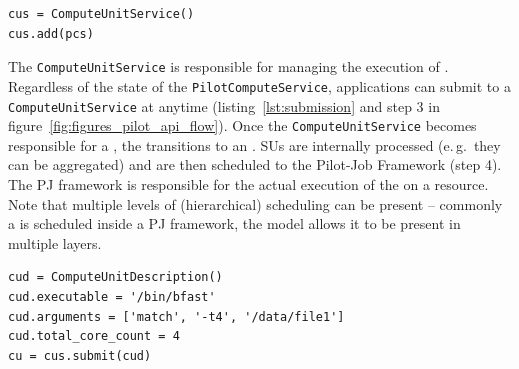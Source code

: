 \documentclass[conference]{IEEEtran}
\begin{document}
\begin{minipage}{0.45 \textwidth}
\begin{lstlisting}[caption={\I{Instantiation
of a \texttt{ComputeUnitService} using a reference to the
\texttt{PilotComputeService}.}}, label={lst:cus_creation}]
cus = ComputeUnitService()
cus.add(pcs)
\end{lstlisting}
\end{minipage}


The \texttt{Compute\-Unit\-Service} is responsible for managing the execution of
\cus.
Regardless of the state of the \texttt{Pilot\-Compute\-Service}, applications can submit \cus to a
\texttt{Compute\-Unit\-Service} at anytime (listing~\ref{lst:submission} and step 3
in figure~\ref{fig:figures_pilot_api_flow}). 
Once the \texttt{Compute\-Unit\-Service} becomes responsible for a \cu, the \cu
transitions to an \su.
SUs are internally processed (e.\,g.\ they can be aggregated) and are then scheduled to the Pilot-Job Framework (step 4). 
The PJ framework is responsible for the actual execution of the \su on a
resource.
Note that multiple levels of (hierarchical) scheduling can be present -- commonly
a \su is scheduled inside a PJ framework, the model allows it to be present
in multiple layers.\\

\begin{minipage}{0.45 \textwidth}
\begin{lstlisting}[caption={\I{Instantiation and 
	submission of a \texttt{Compute\-Unit\-Description}.}}, label={lst:submission}] 
cud = ComputeUnitDescription()
cud.executable = '/bin/bfast'
cud.arguments = ['match', '-t4', '/data/file1']
cud.total_core_count = 4
cu = cus.submit(cud)
\end{lstlisting}
\end{minipage}
\end{document}
